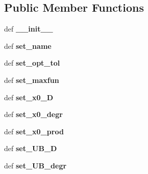 \subsection*{Public Member Functions}
\begin{DoxyCompactItemize}
\item 
\hypertarget{classpyfrp__subwin_1_1fit__dialog_ac5e6d62900ce2b7f44041ce940fba146}{def {\bfseries \+\_\+\+\_\+init\+\_\+\+\_\+}}\label{classpyfrp__subwin_1_1fit__dialog_ac5e6d62900ce2b7f44041ce940fba146}

\item 
\hypertarget{classpyfrp__subwin_1_1fit__dialog_ab6a39ff42feab85aa4ced0511677d065}{def {\bfseries set\+\_\+name}}\label{classpyfrp__subwin_1_1fit__dialog_ab6a39ff42feab85aa4ced0511677d065}

\item 
\hypertarget{classpyfrp__subwin_1_1fit__dialog_a1f04814bb939fba023614cae0fd54bf7}{def {\bfseries set\+\_\+opt\+\_\+tol}}\label{classpyfrp__subwin_1_1fit__dialog_a1f04814bb939fba023614cae0fd54bf7}

\item 
\hypertarget{classpyfrp__subwin_1_1fit__dialog_afbad85cc556c85f72d5bd38d52be0690}{def {\bfseries set\+\_\+maxfun}}\label{classpyfrp__subwin_1_1fit__dialog_afbad85cc556c85f72d5bd38d52be0690}

\item 
\hypertarget{classpyfrp__subwin_1_1fit__dialog_a8afd18c1d4297d78704ec9c50b330de7}{def {\bfseries set\+\_\+x0\+\_\+\+D}}\label{classpyfrp__subwin_1_1fit__dialog_a8afd18c1d4297d78704ec9c50b330de7}

\item 
\hypertarget{classpyfrp__subwin_1_1fit__dialog_ac6c12a5a39920f733991bbe0931d3854}{def {\bfseries set\+\_\+x0\+\_\+degr}}\label{classpyfrp__subwin_1_1fit__dialog_ac6c12a5a39920f733991bbe0931d3854}

\item 
\hypertarget{classpyfrp__subwin_1_1fit__dialog_ab1c06f3336d1e5c9db34a2f752439229}{def {\bfseries set\+\_\+x0\+\_\+prod}}\label{classpyfrp__subwin_1_1fit__dialog_ab1c06f3336d1e5c9db34a2f752439229}

\item 
\hypertarget{classpyfrp__subwin_1_1fit__dialog_afee30ef0df27f1efa63c9aeb8fe0cf4b}{def {\bfseries set\+\_\+\+U\+B\+\_\+\+D}}\label{classpyfrp__subwin_1_1fit__dialog_afee30ef0df27f1efa63c9aeb8fe0cf4b}

\item 
\hypertarget{classpyfrp__subwin_1_1fit__dialog_aa0350ad1a85c53f293d22fae8c15119a}{def {\bfseries set\+\_\+\+U\+B\+\_\+degr}}\label{classpyfrp__subwin_1_1fit__dialog_aa0350ad1a85c53f293d22fae8c15119a}


\end{DoxyCompactItemize}
